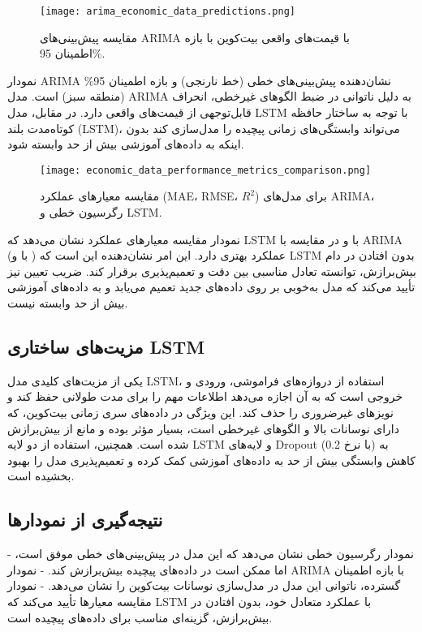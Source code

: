 \begin{figure}[h]
	\centering
	\texttt{[image: arima\_economic\_data\_predictions.png]}
	\caption{مقایسه پیش‌بینی‌های ARIMA با قیمت‌های واقعی بیت‌کوین با بازه اطمینان 95\%.}
	\label{fig:arima_predsictions}
\end{figure}

نمودار ARIMA نشان‌دهنده پیش‌بینی‌های خطی (خط نارنجی) و بازه اطمینان 95\% (منطقه سبز) است. مدل ARIMA به دلیل ناتوانی در ضبط الگوهای غیرخطی، انحراف قابل‌توجهی از قیمت‌های واقعی دارد. در مقابل، مدل LSTM با توجه به ساختار حافظه کوتاه‌مدت بلند (LSTM)، می‌تواند وابستگی‌های زمانی پیچیده را مدل‌سازی کند بدون اینکه به داده‌های آموزشی بیش از حد وابسته شود.

\begin{figure}[h]
	\centering
	\texttt{[image: economic\_data\_performance\_metrics\_comparison.png]}
	\caption{مقایسه معیارهای عملکرد (MAE، RMSE، $R^2$) برای مدل‌های ARIMA، رگرسیون خطی و LSTM.}
	\label{fig:performance_metrics}
\end{figure}

نمودار مقایسه معیارهای عملکرد نشان می‌دهد که LSTM با  و  در مقایسه با ARIMA (با  و ) عملکرد بهتری دارد. این امر نشان‌دهنده این است که LSTM بدون افتادن در دام بیش‌برازش، توانسته تعادل مناسبی بین دقت و تعمیم‌پذیری برقرار کند. ضریب تعیین  نیز تأیید می‌کند که مدل به‌خوبی بر روی داده‌های جدید تعمیم می‌یابد و به داده‌های آموزشی بیش از حد وابسته نیست.

\subsection*{مزیت‌های ساختاری LSTM}
یکی از مزیت‌های کلیدی مدل LSTM، استفاده از دروازه‌های فراموشی، ورودی و خروجی است که به آن اجازه می‌دهد اطلاعات مهم را برای مدت طولانی حفظ کند و نویزهای غیرضروری را حذف کند. این ویژگی در داده‌های سری زمانی بیت‌کوین، که دارای نوسانات بالا و الگوهای غیرخطی است، بسیار مؤثر بوده و مانع از بیش‌برازش شده است. همچنین، استفاده از دو لایه LSTM و لایه‌های Dropout (با نرخ 0.2) به کاهش وابستگی بیش از حد به داده‌های آموزشی کمک کرده و تعمیم‌پذیری مدل را بهبود بخشیده است.

\subsection*{نتیجه‌گیری از نمودارها}
- نمودار رگرسیون خطی نشان می‌دهد که این مدل در پیش‌بینی‌های خطی موفق است، اما ممکن است در داده‌های پیچیده بیش‌برازش کند.
- نمودار ARIMA با بازه اطمینان گسترده، ناتوانی این مدل در مدل‌سازی نوسانات بیت‌کوین را نشان می‌دهد.
- نمودار مقایسه معیارها تأیید می‌کند که LSTM با عملکرد متعادل خود، بدون افتادن در بیش‌برازش، گزینه‌ای مناسب برای داده‌های پیچیده است.

